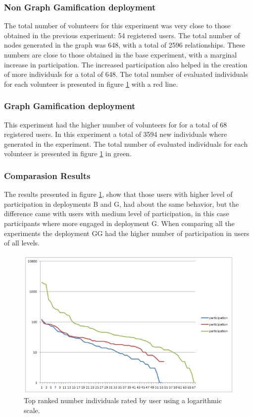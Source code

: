 \documentclass[conference]{IEEEtran}
\begin{document}
\subsubsection{ Non Graph Gamification deployment}
The total number of volunteers for this experiment was very close to those obtained in the previous
experiment: 54 registered users. The total number of nodes generated in the graph was 648, 
with a total of 2596 relationships. These numbers are close to those obtained in the base experiment,
with a marginal increase in participation. The increased participation also helped in the creation of
more individuals for a total of 648. The total number of evaluated
individuals for each volunteer is presented in figure \ref{fig:top-ranked-participation} with a red line. 

\subsubsection{ Graph Gamification deployment}
This experiment had the higher number of volunteers for for a total of 68 registered users. 
In this experiment a total of 3594 new individuals where generated in the experiment. 
The total number of evaluated individuals for each volunteer is presented in figure 
\ref{fig:top-ranked-participation} in green. 

\subsubsection{ Comparasion Results}
The results presented in figure \ref{fig:top-ranked-participation}, show that those users with
higher level of participation in deployments B and G, had about the same behavior, but the difference
came with users with medium level of participation, in this case participants where more engaged in deployment
G. When comparing all the experiments the deployment GG had the higher number of participation in users
of all levels.    

\begin{figure}[!t]
    \centering
        \includegraphics[width=5.5in]{img/comparison.png}
    \caption{Top ranked number individuals rated by user using a
     logarithmic scale.}
    \label{fig:top-ranked-participation}
\end{figure}
\end{document}
